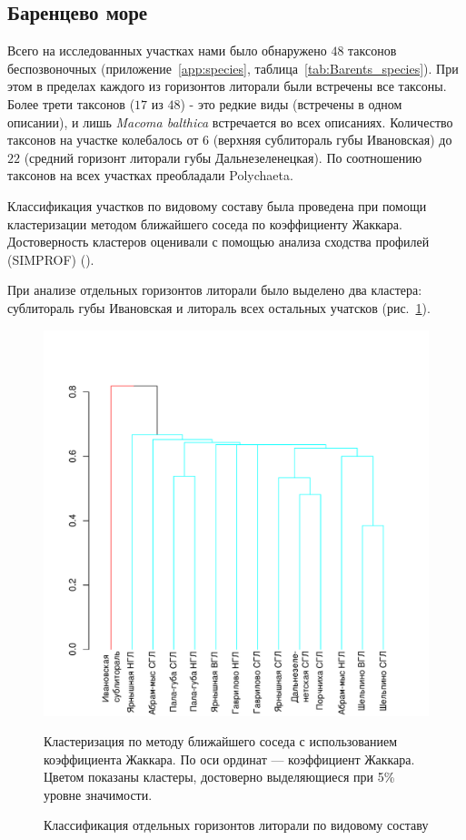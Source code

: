 	\subsection{Баренцево море}

Всего на исследованных участках нами было обнаружено $48$ таксонов беспозвоночных (приложение~\ref{app:species}, таблица~\ref{tab:Barents_species}). 
При этом в пределах каждого из горизонтов литорали были встречены все таксоны. 
Более трети таксонов ($17$ из $48$) - это редкие виды (встречены в одном описании), и лишь {\it Macoma balthica} встречается во всех описаниях. 
Количество таксонов на участке колебалось от $6$ (верхняя сублитораль губы Ивановская) до $22$ (средний горизонт литорали губы Дальнезеленецкая). 
По соотношению таксонов на всех участках преобладали Polychaeta.
	
Классификация участков по видовому составу была проведена при помощи кластеризации методом ближайшего соседа по коэффициенту Жаккара. 
Достоверность кластеров оценивали с помощью анализа сходства профилей (SIMPROF) (\cite{Clarke_et_al_2008}).

При анализе отдельных горизонтов литорали было выделено два кластера: сублитораль губы Ивановская и литораль всех остальных учатсков (рис.~\ref{ris:cluster_barents_species_tidal}). 
	\begin{figure}
		\begin{center}
			\includegraphics{../Barenc_Sea/soobshestvo/Barents_fauna_tidal_jaccard_single_1.pdf}
		\end{center}
	\caption{Классификация отдельных горизонтов литорали по видовому составу}
	\label{ris:cluster_barents_species_tidal}

	\footnotesize{Кластеризация по методу ближайшего соседа с использованием коэффициента Жаккара. По оси ординат --- коэффициент Жаккара. Цветом показаны кластеры, достоверно выделяющиеся при 5\% уровне значимости.}
	\end{figure}

